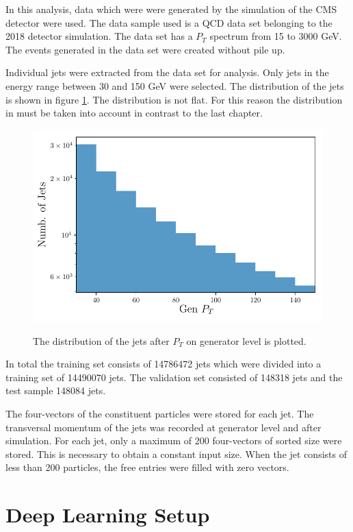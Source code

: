 \documentclass[12pt, a4paper]{thesis}
\begin{document}
In this analysis, data which were were generated by the simulation of
the CMS detector were used. The data sample used is a QCD data set
belonging to the 2018 detector simulation. The data set has a \(P_T\)
spectrum from 15 to 3000 GeV. The events generated in the data set
were created without pile up.

Individual jets were extracted from the data set for analysis. Only
jets in the energy range between 30 and 150 GeV were selected. The
distribution of the jets is shown in figure \ref{jet_distri}. The
distribution is not flat.  For this reason the distribution in must be
taken into account in contrast to the last chapter.

\begin{figure}[htbp]
\centering
\includegraphics[width=.9\linewidth]{../images/jet_distri.pdf}
\label{jet_distri}
\caption{ The distribution of the jets after \(P_T\) on generator
  level is plotted.}
\end{figure}

In total the training set consists of 14786472 jets which were divided
into a training set of 14490070 jets. The validation set consisted of
148318 jets and the test sample 148084 jets.

The four-vectors of the constituent particles were stored for each
jet. The transversal momentum of the jets was recorded at generator
level and after simulation. For each jet, only a maximum of 200
four-vectors of sorted size were stored. This is necessary to obtain a
constant input size. When the jet consists of less than 200 particles,
the free entries were filled with zero vectors.

\section{Deep Learning Setup}
\label{sec:orgf3b24cc}
\end{document}
